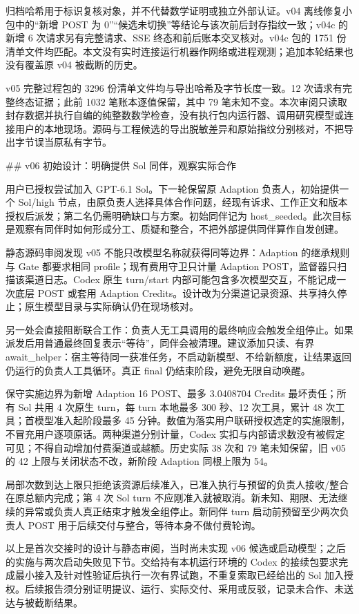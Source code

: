 归档哈希用于标识复核对象，并不代替数学证明或独立外部认证。v04 离线修复小包中的“新增 POST 为 0”“候选未切换”等结论与该次前后封存指纹一致；v04c 的新增 6 次请求另有完整请求、SSE 终态和前后账本交叉核对。v04c 包的 1751 份清单文件均匹配。本文没有实时连接运行机器作网络或进程观测；追加本轮结果也没有覆盖原 v04 被截断的历史。

v05 完整过程包的 3296 份清单文件均与导出哈希及字节长度一致。12 次请求有完整终态证据；此前 1032 笔账本逐值保留，其中 79 笔未知不变。本次审阅只读取封存数据并执行自编的纯整数数学检查，没有执行包内运行器、调用研究模型或连接用户的本地现场。源码与工程候选的导出脱敏差异和原始指纹分别核对，不把导出字节误当原私有字节。

## v06 初始设计：明确提供 Sol 同伴，观察实际合作

用户已授权尝试加入 GPT-6.1 Sol。下一轮保留原 Adaption 负责人，初始提供一个 Sol/high 节点，由原负责人选择具体合作问题，经现有诉求、工作正文和版本授权后派发；第二名仍需明确缺口与方案。初始同伴记为 host_seeded。此次目标是观察有同伴时如何形成分工、质疑和整合，不把外部提供同伴算作自发创建。

静态源码审阅发现 v05 不能只改模型名称就获得同等边界：Adaption 的继承规则与 Gate 都要求相同 profile；现有费用守卫只计量 Adaption POST，监督器只扫描该渠道日志。Codex 原生 turn/start 内部可能包含多次模型交互，不能记成一次底层 POST 或套用 Adaption Credits。设计改为分渠道记录资源、共享持久停止；原生模型目录与实际确认仍在现场核对。

另一处会直接阻断联合工作：负责人无工具调用的最终响应会触发全组停止。如果派发后用普通最终回复表示“等待”，同伴会被清理。建议添加只读、有界 await_helper：宿主等待同一获准任务，不启动新模型、不给新额度，让结果返回仍运行的负责人工具循环。真正 final 仍结束阶段，避免无限自动唤醒。

保守实施边界为新增 Adaption 16 POST、最多 3.0408704 Credits 最坏责任；所有 Sol 共用 4 次原生 turn，每 turn 本地最多 300 秒、12 次工具，累计 48 次工具；首模型准入起阶段最多 45 分钟。数值为落实用户联研授权选定的实施限制，不冒充用户逐项原话。两种渠道分别计量，Codex 实扣与内部请求数没有被假定可见；不得自动增加付费渠道或越额。历史实际 38 次和 79 笔未知保留，旧 v05 的 42 上限与关闭状态不改，新阶段 Adaption 同根上限为 54。

局部次数到达上限只拒绝该资源后续准入，已准入执行与预留的负责人接收/整合在原总额内完成；第 4 次 Sol turn 不应刚准入就被取消。新未知、期限、无法继续的异常或负责人真正结束才触发全组停止。新同伴 turn 启动前预留至少两次负责人 POST 用于后续交付与整合，等待本身不做付费轮询。

以上是首次交接时的设计与静态审阅，当时尚未实现 v06 候选或启动模型；之后的实施与两次启动失败见下节。交给持有本机运行环境的 Codex 的接续包要求完成最小接入及针对性验证后执行一次有界试跑，不重复索取已经给出的 Sol 加入授权。后续报告须分别证明提议、运行、实际交付、采用或反驳，记录未合作、未送达与被截断结果。

